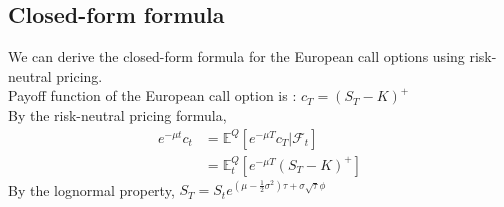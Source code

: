 \subsection{Closed-form formula}
We can derive the closed-form formula for the European call options using risk-neutral pricing.\\
Payoff function of the European call option is : $c_{T} = (S_{T} - K)^{+}$\\
By the risk-neutral pricing formula,
\begin{equation}
\begin{split}
e^{-\mu t}c_{t}
&= \mathbb{E}^{Q}[e^{-\mu T}c_{T} | \mathcal{F}_{t}]\\
&= \mathbb{E}_{t}^{Q}[e^{-\mu T}(S_{T} - K)^{+}]
\end{split}
\end{equation}
By the lognormal property, \quad
$S_{T} = S_{t}e^{(\mu - \frac{1}{2}\sigma^{2})\tau + \sigma\sqrt{\tau}\phi}$
